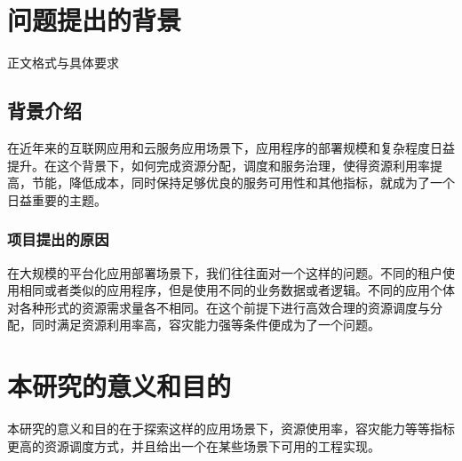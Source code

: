 \section{问题提出的背景}

\par 正文格式与具体要求\autocite{zjuthesisrules}

\subsection{背景介绍}

在近年来的互联网应用和云服务应用场景下，应用程序的部署规模和复杂程度日益提升。在这个背景下，如何完成资源分配，调度和服务治理，使得资源利用率提高，节能，降低成本，同时保持足够优良的服务可用性和其他指标，就成为了一个日益重要的主题。

\subsubsection{项目提出的原因}

在大规模的平台化应用部署场景下，我们往往面对一个这样的问题。不同的租户使用相同或者类似的应用程序，但是使用不同的业务数据或者逻辑。不同的应用个体对各种形式的资源需求量各不相同。在这个前提下进行高效合理的资源调度与分配，同时满足资源利用率高，容灾能力强等条件便成为了一个问题。

\section{本研究的意义和目的}

本研究的意义和目的在于探索这样的应用场景下，资源使用率，容灾能力等等指标更高的资源调度方式，并且给出一个在某些场景下可用的工程实现。